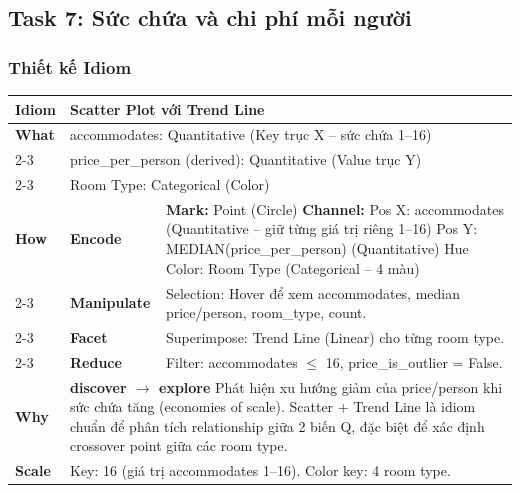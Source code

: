 \subsection{Task 7: Sức chứa và chi phí mỗi người}

\subsubsection{Thiết kế Idiom}

\begin{table}[H]
\centering
\renewcommand{\arraystretch}{1.1}
\begin{tabularx}{\textwidth}{|l|l|X|}
\hline
\textbf{Idiom} & \multicolumn{2}{l|}{\textbf{Scatter Plot với Trend Line}} \\ \hline
\textbf{What}
& \multicolumn{2}{X|}{accommodates: Quantitative (Key trục X -- sức chứa 1--16)} \\ \cline{2-3}
& \multicolumn{2}{X|}{price\_per\_person (derived): Quantitative (Value trục Y)} \\ \cline{2-3}
& \multicolumn{2}{X|}{Room Type: Categorical (Color)} \\ \hline
\textbf{How}
& \textbf{Encode} &
\textbf{Mark:} Point (Circle) \newline
\textbf{Channel:} \newline
\hspace*{1em} Pos X: accommodates (Quantitative -- giữ từng giá trị riêng 1--16) \newline
\hspace*{1em} Pos Y: MEDIAN(price\_per\_person) (Quantitative) \newline
\hspace*{1em} Hue Color: Room Type (Categorical -- 4 màu) \\ \cline{2-3}
& \textbf{Manipulate} &
Selection: Hover để xem accommodates, median price/person, room\_type, count. \\ \cline{2-3}
& \textbf{Facet} &
Superimpose: Trend Line (Linear) cho từng room type. \\ \cline{2-3}
& \textbf{Reduce} &
Filter: accommodates $\leq$ 16, price\_is\_outlier = False. \\ \hline
\textbf{Why} & \multicolumn{2}{X|}{
\textbf{discover $\rightarrow$ explore} \newline
Phát hiện xu hướng giảm của price/person khi sức chứa tăng (economies of scale). Scatter + Trend Line là idiom chuẩn để phân tích relationship giữa 2 biến Q, đặc biệt để xác định crossover point giữa các room type.
} \\ \hline
\textbf{Scale} & \multicolumn{2}{X|}{
Key: 16 (giá trị accommodates 1--16). \newline
Color key: 4 room type.
} \\ \hline
\end{tabularx}
\end{table}

